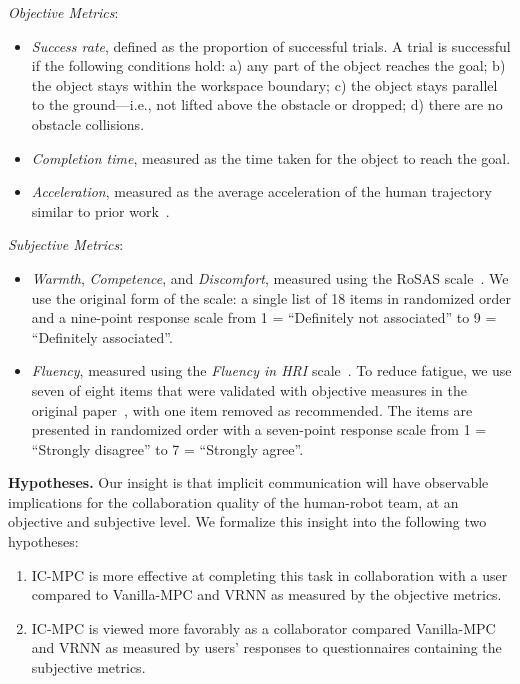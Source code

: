 \textit{Objective Metrics}:
\begin{itemize}
    \item \emph{Success rate}, defined as the proportion of successful trials. A trial is successful if the following conditions hold:
    a) any part of the object reaches the goal; b) the object stays within the workspace boundary; c) the object stays parallel to the ground---i.e., not lifted above the obstacle or dropped; d) there are no obstacle collisions.
    \item \emph{Completion time}, measured as the time taken for the object to reach the goal.
    \item \emph{Acceleration}, measured as the average acceleration of the human trajectory similar to prior work~\citep{mavrogiannis2022socialmomentum}.
\end{itemize}

\textit{Subjective Metrics}:
\begin{itemize}
    \item \emph{Warmth}, \emph{Competence}, and \emph{Discomfort}, measured using the RoSAS scale~\citep{carpinella2017robotic}.
    We use the original form of the scale: a single list of 18 items in randomized order and a nine-point response scale from 1 = ``Definitely not associated'' to 9 = ``Definitely associated''.
    \item \emph{Fluency}, measured using the \emph{Fluency in HRI} scale~\citep{hoffman2019evaluating}. To reduce fatigue, we use seven of eight items that were validated with objective measures in the original paper~\citep{hoffman2019evaluating}, with one item removed as recommended.
    The items are presented in randomized order with a seven-point response scale from 1 = ``Strongly disagree'' to 7 = ``Strongly agree''.
\end{itemize}

\textbf{Hypotheses.} Our insight is that implicit communication will have observable implications for the collaboration quality of the human-robot team, at an objective and subjective level. We formalize this insight into the following two hypotheses:

\begin{enumerate}[label=\textbf{H\arabic*}]
    \item IC-MPC is more effective at completing this task in collaboration with a user compared to Vanilla-MPC and VRNN as measured by the objective metrics.
    \item IC-MPC is viewed more favorably as a collaborator compared Vanilla-MPC and VRNN as measured by users' responses to questionnaires containing the subjective metrics.
\end{enumerate}


